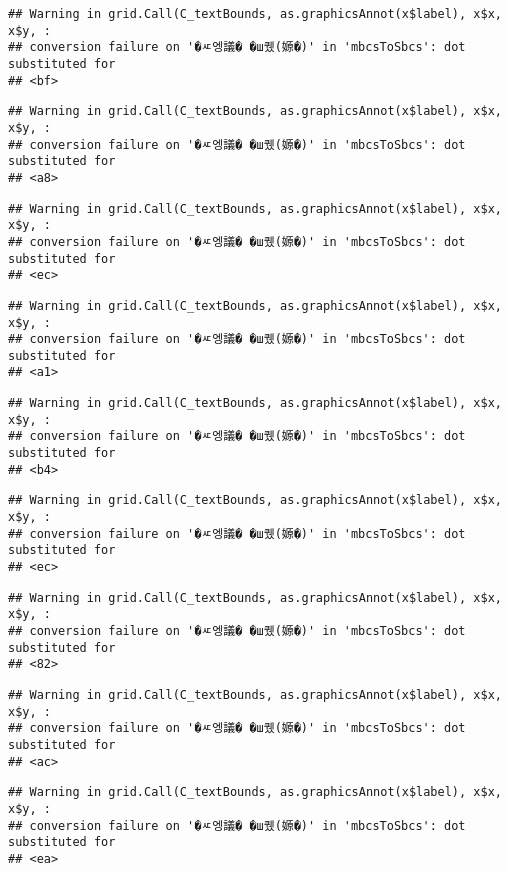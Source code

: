 \documentclass[
]{article}
\begin{document}
\begin{verbatim}
## Warning in grid.Call(C_textBounds, as.graphicsAnnot(x$label), x$x, x$y, :
## conversion failure on '�ㅼ엥議� �ш퀬(嫄�)' in 'mbcsToSbcs': dot substituted for
## <bf>
\end{verbatim}

\begin{verbatim}
## Warning in grid.Call(C_textBounds, as.graphicsAnnot(x$label), x$x, x$y, :
## conversion failure on '�ㅼ엥議� �ш퀬(嫄�)' in 'mbcsToSbcs': dot substituted for
## <a8>
\end{verbatim}

\begin{verbatim}
## Warning in grid.Call(C_textBounds, as.graphicsAnnot(x$label), x$x, x$y, :
## conversion failure on '�ㅼ엥議� �ш퀬(嫄�)' in 'mbcsToSbcs': dot substituted for
## <ec>
\end{verbatim}

\begin{verbatim}
## Warning in grid.Call(C_textBounds, as.graphicsAnnot(x$label), x$x, x$y, :
## conversion failure on '�ㅼ엥議� �ш퀬(嫄�)' in 'mbcsToSbcs': dot substituted for
## <a1>
\end{verbatim}

\begin{verbatim}
## Warning in grid.Call(C_textBounds, as.graphicsAnnot(x$label), x$x, x$y, :
## conversion failure on '�ㅼ엥議� �ш퀬(嫄�)' in 'mbcsToSbcs': dot substituted for
## <b4>
\end{verbatim}

\begin{verbatim}
## Warning in grid.Call(C_textBounds, as.graphicsAnnot(x$label), x$x, x$y, :
## conversion failure on '�ㅼ엥議� �ш퀬(嫄�)' in 'mbcsToSbcs': dot substituted for
## <ec>
\end{verbatim}

\begin{verbatim}
## Warning in grid.Call(C_textBounds, as.graphicsAnnot(x$label), x$x, x$y, :
## conversion failure on '�ㅼ엥議� �ш퀬(嫄�)' in 'mbcsToSbcs': dot substituted for
## <82>
\end{verbatim}

\begin{verbatim}
## Warning in grid.Call(C_textBounds, as.graphicsAnnot(x$label), x$x, x$y, :
## conversion failure on '�ㅼ엥議� �ш퀬(嫄�)' in 'mbcsToSbcs': dot substituted for
## <ac>
\end{verbatim}

\begin{verbatim}
## Warning in grid.Call(C_textBounds, as.graphicsAnnot(x$label), x$x, x$y, :
## conversion failure on '�ㅼ엥議� �ш퀬(嫄�)' in 'mbcsToSbcs': dot substituted for
## <ea>
\end{verbatim}
\end{document}
